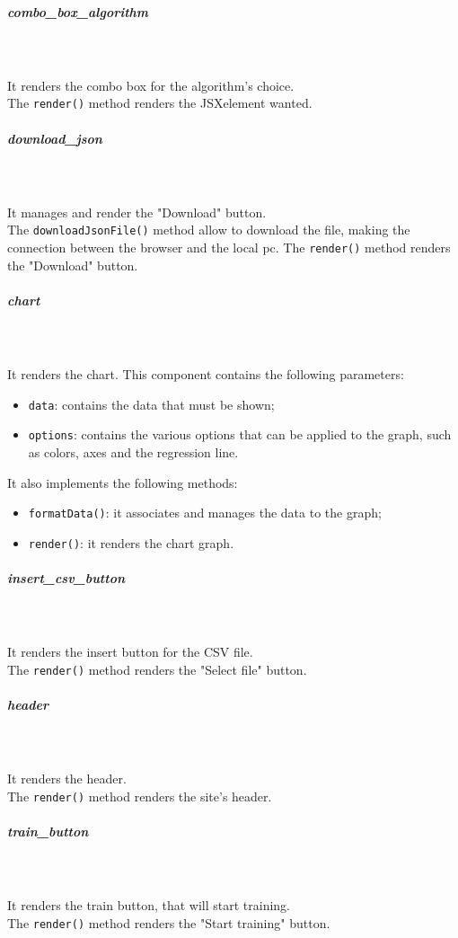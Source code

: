 \subparagraph*{combo\_box\_algorithm}\mbox{} \\ \mbox{} \\
It renders the combo box for the algorithm's choice.\\
The \texttt{render()} method renders the JSX\glo element wanted.

\subparagraph*{download\_json}\mbox{} \\ \mbox{} \\
It manages and render the "Download" button.\\
The \texttt{downloadJsonFile()} method allow to download the file, making the connection between the browser and the local pc.
The \texttt{render()} method renders the "Download" button.

\subparagraph*{chart}\mbox{} \\ \mbox{} \\
It renders the chart.
This component contains the following parameters: 
\begin{itemize}
\item \texttt{data}: contains the data that must be shown;
\item \texttt{options}: contains the various options that can be applied to the graph, such as colors, axes and the regression line.
\end{itemize}
It also implements the following methods: 
\begin{itemize}
\item \texttt{formatData()}: it associates and manages the data to the graph;
\item \texttt{render()}: it renders the chart graph.

\end{itemize}

\subparagraph*{insert\_csv\_button}\mbox{} \\ \mbox{} \\
It renders the insert button for the CSV file.\\
The \texttt{render()} method renders the "Select file" button.

\subparagraph*{header}\mbox{} \\ \mbox{} \\
It renders the header.\\
The \texttt{render()} method renders the site's header.

\subparagraph*{train\_button}\mbox{} \\ \mbox{} \\
It renders the train button, that will start training.\\
The \texttt{render()} method renders the "Start training" button.

